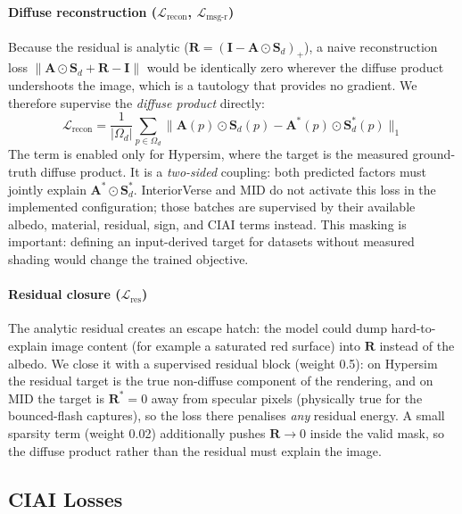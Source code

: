 \paragraph{Diffuse reconstruction ($\mathcal{L}_{\text{recon}}$,
$\mathcal{L}_{\text{msg-r}}$)}
Because the residual is analytic ($\mathbf{R} = (\mathbf{I} - \mathbf{A}\odot\mathbf{S}_d)_+$),
a naive reconstruction loss $\|\mathbf{A}\odot\mathbf{S}_d + \mathbf{R} - \mathbf{I}\|$
would be identically zero wherever the diffuse product undershoots the image, which is a
tautology that provides no gradient.
We therefore supervise the \emph{diffuse product} directly:
\begin{equation}
  \mathcal{L}_{\text{recon}} =
  \frac{1}{|\Omega_d|}\sum_{p \in \Omega_d}
  \bigl\| \mathbf{A}(p) \odot \mathbf{S}_d(p) -
          \mathbf{A}^*(p) \odot \mathbf{S}^*_d(p) \bigr\|_1
  \label{eq:l_recon}
\end{equation}
The term is enabled only for Hypersim, where the target is the measured
ground-truth diffuse product. It is a \emph{two-sided} coupling: both predicted
factors must jointly explain $\mathbf{A}^*\odot\mathbf{S}^*_d$. InteriorVerse and
MID do not activate this loss in the implemented configuration; those batches
are supervised by their available albedo, material, residual, sign, and CIAI
terms instead. This masking is important: defining an input-derived target for
datasets without measured shading would change the trained objective.

\paragraph{Residual closure ($\mathcal{L}_{\text{res}}$)}
The analytic residual creates an escape hatch: the model could dump hard-to-
explain image content (for example a saturated red surface) into $\mathbf{R}$
instead of the albedo.
We close it with a supervised residual block (weight 0.5): on Hypersim the
residual target is the true non-diffuse component of the rendering, and on MID
the target is $\mathbf{R}^* = 0$ away from specular pixels (physically true for
the bounced-flash captures), so the loss there penalises \emph{any} residual
energy.
A small sparsity term (weight 0.02) additionally pushes $\mathbf{R} \to 0$
inside the valid mask, so the diffuse product rather than the residual must explain
the image.

\subsection{CIAI Losses}


